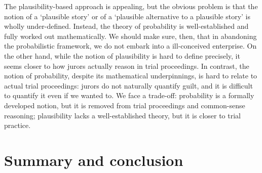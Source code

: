 \documentclass[10pt]{article}
\begin{document}
The plausibility-based approach is appealing, but the obvious problem is that the notion of a `plausible story' or of a `plausible alternative to a plausible story' is wholly under-defined. Instead, the theory of probability is well-established and fully worked out mathematically. We should make sure, then, that in abandoning the probabilistic framework, we do not embark into a ill-conceived enterprise. On the other hand, while the notion of plausibility is hard to define precisely, it seems closer to how jurors actually reason in trial proceedings. In contrast, the notion of probability, despite its 
mathematical underpinnings, is hard to relate to actual trial proceedings: jurors do not naturally quantify guilt, and it is difficult to quantify it even if we wanted to. We face a trade-off: probability is a formally developed notion, but it is 
removed from trial proceedings and common-sense reasoning; plausibility lacks a well-established theory, but it is closer to trial practice. 





\section{Summary and conclusion}

%
	

\end{document}
